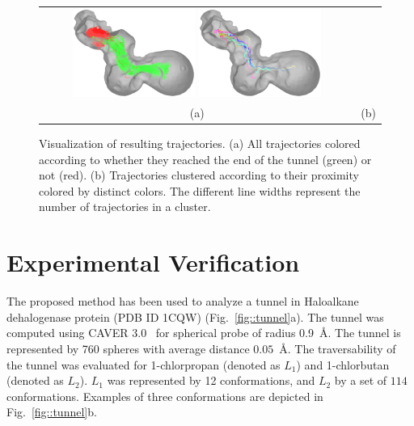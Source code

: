 \documentclass{svmult}
\def\LA{L_1}
\def\LB{L_2}
\begin{document}
\begin{figure}
\centering
\begin{tabular}{cc}
\includegraphics[width=0.4\textwidth]{fig/trajectories-all}
\includegraphics[width=0.4\textwidth]{fig/trajectories-clustered-21} \\
(a) & (b) \\                       
\end{tabular}
\caption{Visualization of resulting trajectories.
(a) All trajectories colored according to whether they reached the end of the tunnel (green) or not (red).
(b) Trajectories clustered according to their proximity colored by distinct colors.
The different line widths represent the number of trajectories in a cluster.
\label{fig:trajectories}
}
\end{figure}







\section{Experimental Verification}

The proposed method has been used to analyze a tunnel in Haloalkane dehalogenase protein (PDB ID 1CQW) (Fig.~\ref{fig::tunnel}a).
The tunnel was computed using CAVER 3.0~\cite{caver3} for spherical probe of radius 0.9~\AA.
The tunnel is represented by 760 spheres with average distance $0.05$~\AA.
The traversability of the tunnel was evaluated for 1-chlorpropan (denoted as $\LA$) and 1-chlorbutan (denoted as $\LB$).
$\LA$ was represented by 12 conformations, and $\LB$ by a set of $114$ conformations.
Examples of three conformations are depicted in Fig.~\ref{fig::tunnel}b.
\end{document}
